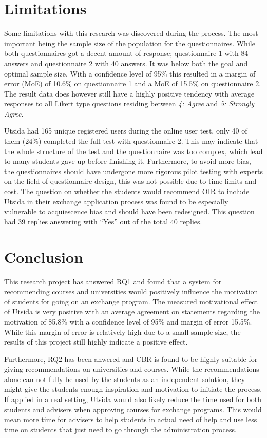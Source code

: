 \section{Limitations}
Some limitations with this research was discovered during the process. The most important being the sample size of the population for the questionnaires. While both questionnaires got a decent amount of response; questionnaire 1 with 84 answers and questionnaire 2 with 40 answers. It was below both the goal and optimal sample size. With a confidence level of 95\% this resulted in a margin of error (MoE) of 10.6\% on questionnaire 1 and a MoE of 15.5\% on questionnaire 2. The result data does however still have a highly positive tendency with average responses to all Likert type questions residing between \textit{4: Agree} and \textit{5: Strongly Agree}.

Utsida had 165 unique registered users during the online user test, only 40 of them (24\%) completed the full test with questionnaire 2. This may indicate that the whole structure of the test and the questionnaire was too complex, which lead to many students gave up before finishing it.  Furthermore, to avoid more bias, the questionnaires should have undergone more rigorous pilot testing with experts on the field of questionnaire design, this was not possible due to time limits and cost. The question on whether the students would recommend OIR to include Utsida in their exchange application process was found to be especially vulnerable to acquiescence bias and should have been redesigned. This question had 39 replies answering with \enquote{Yes} out of the total 40 replies.

\section{Conclusion}

This research project has answered RQ1 and found that a system for recommending courses and universities would positively influence the motivation of students for going on an exchange program. The measured motivational effect of Utsida is very positive with an average agreement on statements regarding the motivation of 85.8\% with a confidence level of 95\% and margin of error 15.5\%. While this margin of error is relatively high due to a small sample size, the results of this project still highly indicate a positive effect.

Furthermore, RQ2 has been anwered and CBR is found to be highly suitable for giving recommendations on universities and courses. While the recommendations alone can not fully be used by the students as an independent solution, they might give the students enough inspiration and motivation to initiate the process. If applied in a real setting, Utsida would also likely reduce the time used for both students and advisers when approving courses for exchange programs. This would mean more time for advisers to help students in actual need of help and use less time on students that just need to go through the administration process.

